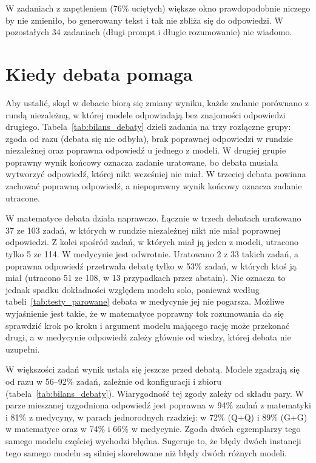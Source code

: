 W zadaniach z zapętleniem (76\% uciętych) większe okno prawdopodobnie niczego by nie zmieniło, bo generowany tekst i tak nie zbliża się do odpowiedzi. W pozostałych 34 zadaniach (długi prompt i długie rozumowanie) nie wiadomo.

\section{Kiedy debata pomaga}
\label{sec:kiedy_debata_pomaga}

Aby ustalić, skąd w debacie biorą się zmiany wyniku, każde zadanie porównano z rundą niezależną, w której modele odpowiadają bez znajomości odpowiedzi drugiego. Tabela~\ref{tab:bilans_debaty} dzieli zadania na trzy rozłączne grupy: zgoda od razu (debata się nie odbyła), brak poprawnej odpowiedzi w rundzie niezależnej oraz poprawna odpowiedź u jednego z modeli. W drugiej grupie poprawny wynik końcowy oznacza zadanie uratowane, bo debata musiała wytworzyć odpowiedź, której nikt wcześniej nie miał. W trzeciej debata powinna zachować poprawną odpowiedź, a niepoprawny wynik końcowy oznacza zadanie utracone.



W matematyce debata działa naprawczo. Łącznie w trzech debatach uratowano 37 ze 103 zadań, w których w rundzie niezależnej nikt nie miał poprawnej odpowiedzi. Z kolei spośród zadań, w których miał ją jeden z modeli, utracono tylko 5 ze 114. W medycynie jest odwrotnie. Uratowano 2 z 33 takich zadań, a poprawna odpowiedź przetrwała debatę tylko w 53\% zadań, w których ktoś ją miał (utracono 51 ze 108, w 13 przypadkach przez abstain). Nie oznacza to jednak spadku dokładności względem modelu solo, ponieważ według tabeli~\ref{tab:testy_parowane} debata w medycynie jej nie pogarsza. Możliwe wyjaśnienie jest takie, że w matematyce poprawny tok rozumowania da się sprawdzić krok po kroku i argument modelu mającego rację może przekonać drugi, a w medycynie odpowiedź zależy głównie od wiedzy, której debata nie uzupełni.

W większości zadań wynik ustala się jeszcze przed debatą. Modele zgadzają się od razu w 56--92\% zadań, zależnie od konfiguracji i zbioru (tabela~\ref{tab:bilans_debaty}). Wiarygodność tej zgody zależy od składu pary. W parze mieszanej uzgodniona odpowiedź jest poprawna w 94\% zadań z matematyki i 81\% z medycyny, w parach jednorodnych rzadziej: w 72\% (Q+Q) i 89\% (G+G) w matematyce oraz w 74\% i 66\% w medycynie. Zgoda dwóch egzemplarzy tego samego modelu częściej wychodzi błędna. Sugeruje to, że błędy dwóch instancji tego samego modelu są silniej skorelowane niż błędy dwóch różnych modeli.

